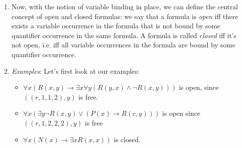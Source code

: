 \begin{enumerate}[\thesection.1]
\begin{enumerate}[(i)]
		\end{enumerate}
	
		\item Now, with the notion of variable binding in place, we can define the central concept of open and closed formulas: we say that a formula is \emph{open} iff there exists a variable occurrence in the formula that is not bound by some quantifier occurrence in the same formula. A formula is called \emph{closed} iff it's not open, i.e. iff all variable occurrences in the formula are bound by some quantifier occurrence. 
	
		\item \emph{Examples}: Let's first look at our examples:
		
		
			\begin{itemize}
			
				\item $\forall x(R(x,y)\to \exists x\forall y(R(y,x)\land \neg R(x,y)))$ is open, since $((r,1,1,2),y)$ is free.

			
				\item $\forall x(\exists y \neg R(x,y)\lor (P(x)\to R(c,y)))$ is open since $( ( r,1,2,2,2), y)$ is free
				
				\item $\forall x({N}(x)\to {\exists x}R(x,x))$ is closed.
			
			\end{itemize}


\end{enumerate}
